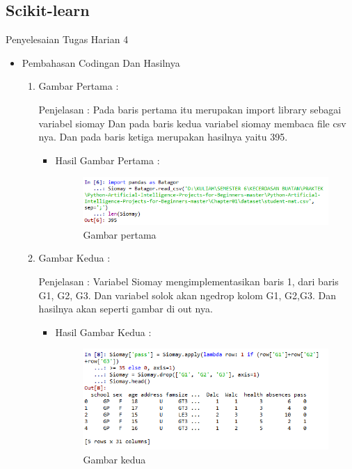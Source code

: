 \subsection{Scikit-learn}
Penyelesaian Tugas Harian 4 
\begin{itemize}
\item Pembahasan Codingan Dan Hasilnya
\begin{enumerate}
\item Gambar Pertama :
\par Penjelasan : Pada baris pertama itu merupakan import library sebagai variabel siomay  Dan pada baris kedua variabel siomay membaca file csv nya. Dan pada baris ketiga merupakan hasilnya yaitu 395.

\par
\begin{itemize}
\par
\item Hasil  Gambar Pertama :
\par

\begin{figure}[ht]
\centering
\includegraphics[scale=0.6]{figures/AIP/jd1.PNG}
\caption{ Gambar pertama}
\label{1}
\end{figure}

\par
\end{itemize}
\item  Gambar Kedua :
\par Penjelasan : Variabel Siomay mengimplementasikan baris 1, dari baris G1, G2, G3. Dan variabel solok akan ngedrop kolom G1, G2,G3. Dan hasilnya akan seperti gambar di out nya.
\par 
\begin{itemize}
\par
\item Hasil Gambar Kedua :

\begin{figure}[ht]
\centering
\includegraphics[scale=0.7]{figures/AIP/jd2.PNG}
\caption{Gambar kedua}
\label{2}
\end{figure}


\end{itemize}
\end{enumerate}
\end{itemize}
